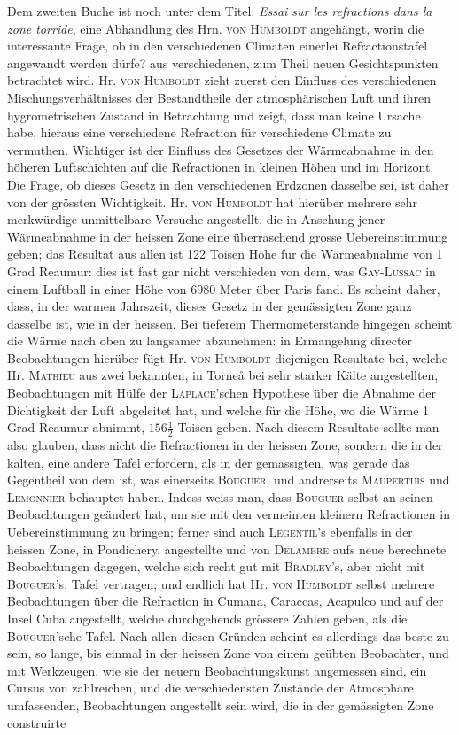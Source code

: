 Dem zweiten Buche ist noch unter dem Titel: \emph{Essai sur les refractions dans la zone torride}, eine Abhandlung des Hrn. \textsc{von Humboldt} angehängt, worin die interessante Frage, ob in den verschiedenen Climaten einerlei Refractionstafel angewandt werden dürfe? aus verschiedenen, zum Theil neuen Gesichtspunkten betrachtet wird. Hr. \textsc{von Humboldt} zieht zuerst den Einfluss des verschiedenen Mischungsverhältnisses der Bestandtheile der atmosphärischen Luft und ihren hygrometrischen Zustand in Betrachtung und zeigt, dass man keine Ursache habe, hieraus eine verschiedene Refraction für verschiedene Climate zu vermuthen. Wichtiger ist der Einfluss des Gesetzes der Wärmeabnahme in den höheren Luftschichten auf die Refractionen in kleinen Höhen und im Horizont. Die Frage, ob dieses Gesetz in den verschiedenen Erdzonen dasselbe sei, ist daher von der grössten Wichtigkeit. Hr. \textsc{von Humboldt} hat hierüber mehrere sehr merkwürdige unmittelbare Versuche angestellt, die in Ansehung jener Wärmeabnahme in der heissen Zone eine überraschend grosse Uebereinstimmung geben; das Resultat aus allen ist 122 Toisen Höhe für die Wärmeabnahme von 1 Grad Reaumur: dies ist fast gar nicht verschieden von dem, was \textsc{Gay-Lussac} in einem Luftball in einer Höhe von 6980 Meter über Paris fand. Es scheint daher, dass, in der warmen Jahrszeit, dieses Gesetz in der gemässigten Zone ganz dasselbe ist, wie in der heissen. Bei tieferem Thermometerstande hingegen scheint die Wärme nach oben zu langsamer abzunehmen: in Ermangelung directer Beobachtungen hierüber fügt Hr. \textsc{von Humboldt} diejenigen Resultate bei, welche Hr. \textsc{Mathieu} aus zwei bekannten, in Torneå bei sehr starker Kälte angestellten, Beobachtungen mit Hülfe der \textsc{Laplace}'schen Hypothese über die Abnahme der Dichtigkeit der Luft abgeleitet hat, und welche für die Höhe, wo die Wärme 1 Grad Reaumur abnimmt, $156\frac{1}{2}$ Toisen geben. Nach diesem Resultate sollte man also glauben, dass nicht die Refractionen in der heissen Zone, sondern die in der kalten, eine andere Tafel erfordern, als in der gemässigten, was gerade das Gegentheil von dem ist, was einerseits \textsc{Bouguer}, und andrerseits \textsc{Maupertuis} und \textsc{Lemonnier} behauptet haben. Indess weiss man, dass \textsc{Bouguer} selbst an seinen Beobachtungen geändert hat, um sie mit den vermeinten kleinern Refractionen in Uebereinstimmung zu bringen; ferner sind auch \textsc{Legentil}'s ebenfalls in der heissen Zone, in Pondichery, angestellte und von \textsc{Delambre} aufs neue berechnete Beobachtungen dagegen, welche sich recht gut mit \textsc{Bradley}'s, aber nicht mit \textsc{Bouguer}'s, Tafel vertragen; und endlich hat Hr. \textsc{von Humboldt} selbst mehrere Beobachtungen über die Refraction in Cumana, Caraccas, Acapulco und auf der Insel Cuba angestellt, welche durchgehends grössere Zahlen geben, als die \textsc{Bouguer}'sche Tafel. Nach allen diesen Gründen scheint es allerdings das beste zu sein, so lange, bis einmal in der heissen Zone von einem geübten Beobachter, und mit Werkzeugen, wie sie der neuern Beobachtungskunst angemessen sind, ein Cursus von zahlreichen, und die verschiedensten Zustände der Atmosphäre umfassenden, Beobachtungen angestellt sein wird, die in der gemässigten Zone construirte 